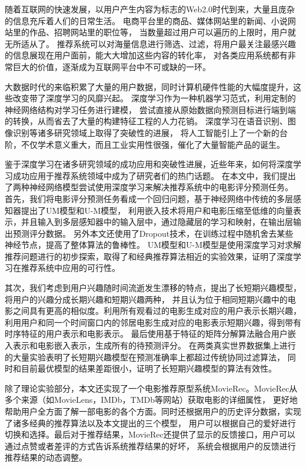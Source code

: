 \begin{cabstract}
随着互联网的快速发展，以用户产生内容为标志的Web2.0时代到来，大量且庞杂的信息充斥着人们的日常生活。
电商平台里的商品、媒体网站里的新闻、小说网站里的作品、招聘网站里的职位等，
当数量超过用户可以遍历的上限时，用户就无所适从了。
推荐系统可以对海量信息进行筛选、过滤，将用户最关注最感兴趣的信息展现在用户面前，能大大增加这些内容的转化率，
对各类应用系统都有非常巨大的价值，逐渐成为互联网平台中不可或缺的一环。

大数据时代的来临积累了大量的用户数据，同时计算机硬件性能的大幅度提升，这些改变带了深度学习的风靡兴起。
深度学习作为一种机器学习范式，利用定制的神经网络结构对学习任务进行建模，
尝试直接从原始数据向预测目标进行端到端的转换，从而省去了大量的构建特征工程的人力花销。
深度学习在语音识别、图像识别等诸多研究领域上取得了突破性的进展，
将人工智能引上了一个新的台阶，不仅学术意义重大，而且工业实用性很强，催化了大量智能产品的诞生。

鉴于深度学习在诸多研究领域的成功应用和突破性进展，近些年来，如何将深度学习成功应用于推荐系统领域中成为了研究者们的热门话题。
在本文中，我们提出了两种神经网络模型尝试使用深度学习来解决推荐系统中的电影评分预测任务。
首先，我们将电影评分预测任务看成一个回归问题，基于神经网络中传统的多层感知器提出了UM模型和U-M模型，
利用嵌入技术将用户和电影压缩至低维的向量表示，并且输入到多层感知器中的输入层中，通过隐藏层的学习和映射，在输出层输出预测评分数据。
另外本文还使用了Dropout技术，在训练过程中随机舍去某些神经节点，提高了整体算法的鲁棒性。
UM模型和U-M模型是使用深度学习对求解推荐问题进行的初步探索，取得了和经典推荐算法相近的实验效果，证明了深度学习在推荐系统中应用的可行性。

其次，我们考虑到用户兴趣随时间流逝发生漂移的特点，提出了长短期兴趣模型，将用户的兴趣分成长期兴趣和短期兴趣两种，
并且认为位于相同短期兴趣中的电影之间具有更高的相似度。利用所有观看过的电影生成对应的用户表示长期兴趣，
利用用户和同一个时间窗口内的邻居电影生成对应的电影表示短期兴趣，得到带有时序特征的用户表示和电影表示。
最后使用基于特征的矩阵分解算法融合用户嵌入表示和电影嵌入表示，生成所有的待预测评分。
在两类真实世界数据集上进行的大量实验表明了长短期兴趣模型在预测准确率上都超过传统协同过滤算法，
同时和目前最优模型的结果差距很小，证明了长短期兴趣模型的算法有效性。

除了理论实验部分，本文还实现了一个电影推荐原型系统MovieRec。MovieRec从多个来源（如MovieLens，IMDb，TMDb等网站）获取电影的详细属性，
更好地帮助用户全方面了解一部电影的各个方面。同时还根据用户的历史评分数据，实现了诸多经典的推荐算法以及本文提出的三个模型，
用户可以根据自己的爱好进行切换和选择。最后对于推荐结果，MovieRec还提供了显示的反馈接口，用户可以通过点赞或者差评的方式告诉系统推荐结果的好坏，
系统会根据用户的反馈进行推荐结果的动态调整。
\end{cabstract}

